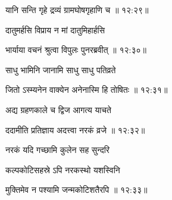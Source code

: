 
{\devanagarifont यानि सन्ति गृहे द्रव्यं ग्रामघोषगृहाणि च {॥ १२:२९॥} \veg\dontdisplaylinenum }%
 
{\devanagarifont दातुमर्हसि विप्राय न मां दातुमिहार्हसि \thinspace{\dandab} \dontdisplaylinenum }%
 

{\devanagarifont भार्याया वचनं श्रुत्वा विपुलः पुनरब्रवीत् {॥ १२:३०॥} \veg\dontdisplaylinenum }%

{\devanagarifont साधु भामिनि जानामि साधु साधु पतिव्रते \thinspace{\dandab} \dontdisplaylinenum }%


{\devanagarifont जितो ऽस्म्यनेन वाक्येन अनेनास्मि हि तोषितः {॥ १२:३१॥} \veg\dontdisplaylinenum }%

{\devanagarifont अद्य ग्रहणकाले च द्विज आगत्य याचते \thinspace{\dandab} \dontdisplaylinenum }%
 

{\devanagarifont ददामीति प्रतिज्ञाय अदत्त्वा नरकं व्रजे {॥ १२:३२॥} \veg\dontdisplaylinenum }%

{\devanagarifont नरकं यदि गच्छामि कुलेन सह सुन्दरि \thinspace{\dandab} \dontdisplaylinenum }%

{\devanagarifont कल्पकोटिसहस्रे ऽपि नरकस्थो यशस्विनि  \danda\dontdisplaylinenum }%


{\devanagarifont मुक्तिमेव न पश्यामि जन्मकोटिशतैरपि {॥ १२:३३॥} \veg\dontdisplaylinenum }%

